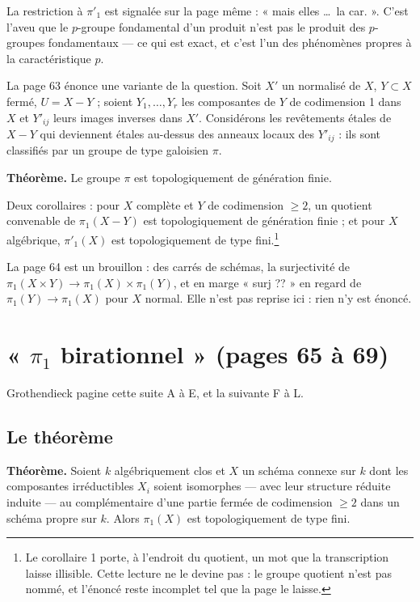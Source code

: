 \documentclass[11pt,a4paper]{article}
\begin{document}
La restriction à $\pi'_{1}$ est signalée sur la page même : « mais elles \dots\
la car. ». C'est l'aveu que le $p$-groupe fondamental d'un produit n'est pas le
produit des $p$-groupes fondamentaux --- ce qui est exact, et c'est l'un des
phénomènes propres à la caractéristique $p$.

La page 63 énonce une variante de la question. Soit $X'$ un normalisé de $X$,
$Y \subset X$ fermé, $U = X - Y$ ; soient $Y_{1}, \dots, Y_{r}$ les composantes
de $Y$ de codimension 1 dans $X$ et $Y'_{ij}$ leurs images inverses dans $X'$.
Considérons les revêtements étales de $X - Y$ qui deviennent étales au-dessus
des anneaux locaux des $Y'_{ij}$ : ils sont classifiés par un groupe de type
galoisien $\pi$.

\textbf{Théorème.} Le groupe $\pi$ est topologiquement de génération finie.

Deux corollaires : pour $X$ complète et $Y$ de codimension $\geqslant 2$, un
quotient convenable de $\pi_{1}(X - Y)$ est topologiquement de génération
finie ; et pour $X$ algébrique, $\pi'_{1}(X)$ est topologiquement de type
fini.\footnote{Le corollaire 1 porte, à l'endroit du quotient, un mot que la
transcription laisse illisible. Cette lecture ne le devine pas : le groupe
quotient n'est pas nommé, et l'énoncé reste incomplet tel que la page le
laisse.}

La page 64 est un brouillon : des carrés de schémas, la surjectivité de
$\pi_{1}(X\times Y)\to\pi_{1}(X)\times\pi_{1}(Y)$, et en marge « surj ?? » en
regard de $\pi_{1}(Y)\to\pi_{1}(X)$ pour $X$ normal. Elle n'est pas reprise
ici : rien n'y est énoncé.

\section*{« $\pi_{1}$ birationnel » (pages 65 à 69)}

Grothendieck pagine cette suite A à E, et la suivante F à L.

\subsection*{Le théorème}

\textbf{Théorème.} Soient $k$ algébriquement clos et $X$ un schéma connexe sur
$k$ dont les composantes irréductibles $X_{i}$ soient isomorphes --- avec leur
structure réduite induite --- au complémentaire d'une partie fermée de
codimension $\geqslant 2$ dans un schéma propre sur $k$. Alors $\pi_{1}(X)$ est
topologiquement de type fini.
\end{document}
